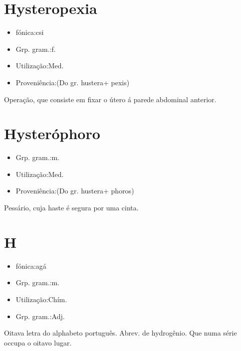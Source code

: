 \documentclass{article}
\begin{document}
\section{Hysteropexia}
\begin{itemize}
\item {fónica:csi}
\end{itemize}
\begin{itemize}
\item {Grp. gram.:f.}
\end{itemize}
\begin{itemize}
\item {Utilização:Med.}
\end{itemize}
\begin{itemize}
\item {Proveniência:(Do gr. \textunderscore hustera\textunderscore  + \textunderscore pexis\textunderscore )}
\end{itemize}
Operação, que consiste em fixar o útero á parede abdominal anterior.
\section{Hysteróphoro}
\begin{itemize}
\item {Grp. gram.:m.}
\end{itemize}
\begin{itemize}
\item {Utilização:Med.}
\end{itemize}
\begin{itemize}
\item {Proveniência:(Do gr. \textunderscore hustera\textunderscore  + \textunderscore phoros\textunderscore )}
\end{itemize}
Pessário, cuja haste é segura por uma cinta.
\section{H}
\begin{itemize}
\item {fónica:agá}
\end{itemize}
\begin{itemize}
\item {Grp. gram.:m.}
\end{itemize}
\begin{itemize}
\item {Utilização:Chím.}
\end{itemize}
\begin{itemize}
\item {Grp. gram.:Adj.}
\end{itemize}
Oitava letra do alphabeto português.
Abrev. de \textunderscore hydrogênio\textunderscore .
Que numa série occupa o oitavo lugar.
\end{document}
